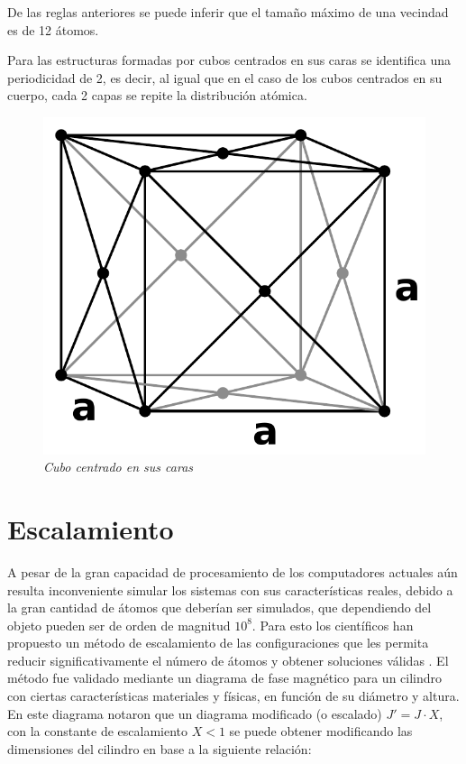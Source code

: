 De las reglas anteriores se puede inferir que el tamaño máximo de una vecindad es de 12 átomos.

Para las estructuras formadas por cubos centrados en sus caras se identifica una periodicidad de 2, es decir, al igual que en el caso de los cubos centrados en su cuerpo, cada 2 capas se repite la distribución atómica.

\begin{figure}[ht]
  \centering
  \includegraphics[scale=.6]{images/FaceCenteredCubic}
  \caption{\em Cubo centrado en sus caras}
  \label{FaceCenteredCubic}
\end{figure}

\section{Escalamiento}

A pesar de la gran capacidad de procesamiento de los computadores actuales aún resulta inconveniente simular los sistemas con sus características reales, debido a la gran cantidad de átomos que deberían ser simulados, que dependiendo del objeto pueden ser de orden de magnitud $10^8$. Para esto los científicos han propuesto un método de escalamiento de las configuraciones que les permita reducir significativamente el número de átomos y obtener soluciones válidas \citep{PhysRevB.71.094435}. El método fue validado mediante un diagrama de fase magnético para un cilindro con ciertas características materiales y físicas, en función de su diámetro y altura. En este diagrama notaron que un diagrama modificado (o escalado) $J' = J \cdot X$, con la constante de escalamiento $X < 1$ se puede obtener modificando las dimensiones del cilindro en base a la siguiente relación:

